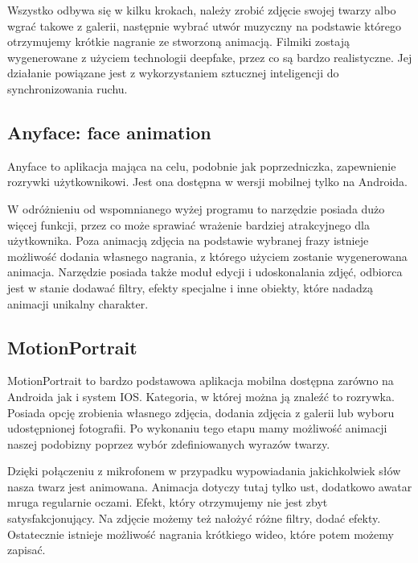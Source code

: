 Wszystko odbywa się w kilku krokach, należy zrobić zdjęcie swojej twarzy albo wgrać takowe z galerii, następnie wybrać utwór muzyczny na podstawie którego otrzymujemy krótkie nagranie ze stworzoną animacją. Filmiki zostają wygenerowane z użyciem technologii deepfake, przez co są bardzo realistyczne. Jej działanie powiązane jest z wykorzystaniem sztucznej inteligencji do synchronizowania ruchu.


\subsection{Anyface: face animation}
Anyface \cite{anyface} to aplikacja mająca na celu, podobnie jak poprzedniczka, zapewnienie rozrywki użytkownikowi. Jest ona dostępna w wersji mobilnej tylko na Androida.

W odróżnieniu od wspomnianego wyżej programu to narzędzie posiada dużo więcej funkcji, przez co może sprawiać wrażenie bardziej atrakcyjnego dla użytkownika. Poza animacją zdjęcia na podstawie wybranej frazy istnieje możliwość dodania własnego nagrania, z którego użyciem zostanie wygenerowana animacja. Narzędzie posiada także moduł edycji i udoskonalania zdjęć, odbiorca jest w stanie dodawać filtry, efekty specjalne i inne obiekty, które nadadzą animacji unikalny charakter. 


\subsection{MotionPortrait}
MotionPortrait \cite{motionportrait} to bardzo podstawowa aplikacja mobilna dostępna zarówno na Androida jak i system IOS. Kategoria, w której można ją znaleźć to rozrywka. Posiada opcję zrobienia własnego zdjęcia, dodania zdjęcia z galerii lub wyboru udostępnionej fotografii. Po wykonaniu tego etapu mamy możliwość animacji naszej podobizny poprzez wybór zdefiniowanych wyrazów twarzy. 

Dzięki połączeniu z mikrofonem w przypadku wypowiadania jakichkolwiek słów nasza twarz jest animowana. Animacja dotyczy tutaj tylko ust, dodatkowo awatar mruga regularnie oczami. Efekt, który otrzymujemy nie jest zbyt satysfakcjonujący. Na zdjęcie możemy też nałożyć różne filtry, dodać efekty. Ostatecznie istnieje możliwość nagrania krótkiego wideo, które potem możemy zapisać.

